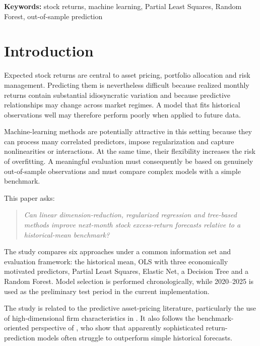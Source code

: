 \documentclass[11pt,a4paper]{article}
\begin{document}
\vspace{0.4em}

\noindent
\textbf{Keywords:}
stock returns, machine learning, Partial Least Squares, Random Forest,
out-of-sample prediction


\section{Introduction}
\label{sec:introduction}

Expected stock returns are central to asset pricing, portfolio allocation and
risk management. Predicting them is nevertheless difficult because realized
monthly returns contain substantial idiosyncratic variation and because
predictive relationships may change across market regimes. A model that fits
historical observations well may therefore perform poorly when applied to
future data.

Machine-learning methods are potentially attractive in this setting because
they can process many correlated predictors, impose regularization and capture
nonlinearities or interactions. At the same time, their flexibility increases
the risk of overfitting. A meaningful evaluation must consequently be based on
genuinely out-of-sample observations and must compare complex models with a
simple benchmark.

This paper asks:

\begin{quote}
\emph{Can linear dimension-reduction, regularized regression and tree-based
methods improve next-month stock excess-return forecasts relative to a
historical-mean benchmark?}
\end{quote}

The study compares six approaches under a common information set and evaluation
framework: the historical mean, OLS with three economically motivated
predictors, Partial Least Squares, Elastic Net, a Decision Tree and a Random
Forest. Model selection is performed chronologically, while 2020--2025 is
used as the preliminary test period in the current implementation.

The study is related to the predictive asset-pricing literature, particularly
the use of high-dimensional firm characteristics in
\textcite{gu2020empirical}. It also follows the benchmark-oriented perspective
of \textcite{welch2008comprehensive}, who show that apparently sophisticated
return-prediction models often struggle to outperform simple historical
forecasts.
\end{document}
